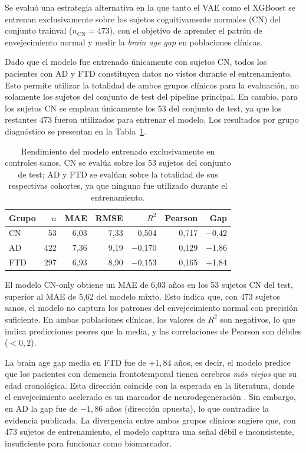 Se evaluó una estrategia alternativa en la que tanto el VAE como el XGBoost se entrenan exclusivamente sobre los sujetos cognitivamente normales (CN) del conjunto trainval ($n_{\text{CN}} = 473$), con el objetivo de aprender el patrón de envejecimiento normal y medir la \textit{brain age gap} en poblaciones clínicas.

Dado que el modelo fue entrenado únicamente con sujetos CN, todos los pacientes con AD y FTD constituyen datos no vistos durante el entrenamiento. Esto permite utilizar la totalidad de ambos grupos clínicos para la evaluación, no solamente los sujetos del conjunto de test del pipeline principal. En cambio, para los sujetos CN se emplean únicamente los 53 del conjunto de test, ya que los restantes 473 fueron utilizados para entrenar el modelo. Los resultados por grupo diagnóstico se presentan en la Tabla~\ref{tab:cn_only}.

\begin{table}[H]
\centering
\caption{Rendimiento del modelo entrenado exclusivamente en controles sanos. CN se evalúa sobre los 53 sujetos del conjunto de test; AD y FTD se evalúan sobre la totalidad de sus respectivas cohortes, ya que ninguno fue utilizado durante el entrenamiento.}
\label{tab:cn_only}
\begin{tabular}{lrrrrrr}
\toprule
\textbf{Grupo} & \textbf{$n$} & \textbf{MAE} & \textbf{RMSE} & \textbf{$R^2$} & \textbf{Pearson} & \textbf{Gap} \\
\midrule
CN  & 53  & 6,03 & 7,33 & 0,504  & 0,717 & $-$0,42 \\
AD  & 422 & 7,36 & 9,19 & $-$0,170 & 0,129 & $-$1,86 \\
FTD & 297 & 6,93 & 8,90 & $-$0,153 & 0,165 & $+$1,84 \\
\bottomrule
\end{tabular}
\end{table}

El modelo CN-only obtiene un MAE de 6,03 años en los 53 sujetos CN del test, superior al MAE de 5,62 del modelo mixto. Esto indica que, con 473 sujetos sanos, el modelo no captura los patrones del envejecimiento normal con precisión suficiente. En ambas poblaciones clínicas, los valores de $R^2$ son negativos, lo que indica predicciones peores que la media, y las correlaciones de Pearson son débiles ($< 0{,}2$).

La brain age gap media en FTD fue de $+1{,}84$ años, es decir, el modelo predice que los pacientes con demencia frontotemporal tienen cerebros \textit{más viejos} que su edad cronológica. Esta dirección coincide con la esperada en la literatura, donde el envejecimiento acelerado es un marcador de neurodegeneración \cite{franke2010estimating}. Sin embargo, en AD la gap fue de $-1{,}86$ años (dirección opuesta), lo que contradice la evidencia publicada. La divergencia entre ambos grupos clínicos sugiere que, con 473 sujetos de entrenamiento, el modelo captura una señal débil e inconsistente, insuficiente para funcionar como biomarcador.

